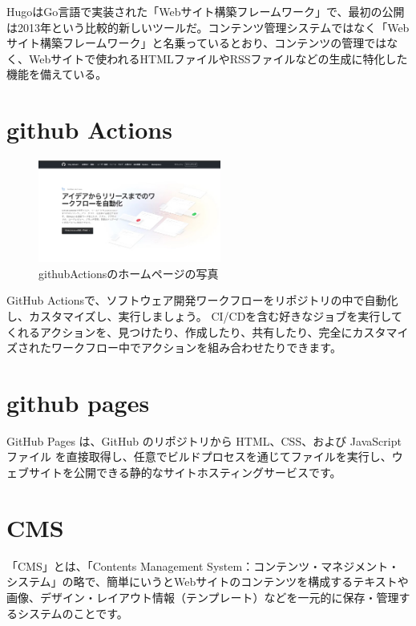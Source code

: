   \begin{tcolorbox}[title=hugoとは]
    HugoはGo言語で実装された「Webサイト構築フレームワーク」で、最初の公開は2013年という比較的新しいツールだ。コンテンツ管理システムではなく「Webサイト構築フレームワーク」と名乗っているとおり、コンテンツの管理ではなく、Webサイトで使われるHTMLファイルやRSSファイルなどの生成に特化した機能を備えている。
    \cite{hugoとは} \cite{hugo公式}
  \end{tcolorbox}

\section{github Actions}

  \begin{figure}[H]
    \centering
    \includegraphics[width=6cm]{./image/02-chap3/githubActions.png}
    \caption{githubActionsのホームページの写真}
    \label{chap3-githubAction-image}
  \end{figure}

  \begin{tcolorbox}[title=github pagesとは]
    GitHub Actionsで、ソフトウェア開発ワークフローをリポジトリの中で自動化し、カスタマイズし、実行しましょう。 CI/CDを含む好きなジョブを実行してくれるアクションを、見つけたり、作成したり、共有したり、完全にカスタマイズされたワークフロー中でアクションを組み合わせたりできます。
    \cite{githubAction}
  \end{tcolorbox}

\section{github pages}

  \begin{tcolorbox}[title=hugoとは]
    GitHub Pages は、GitHub のリポジトリから HTML、CSS、および JavaScript ファイル を直接取得し、任意でビルドプロセスを通じてファイルを実行し、ウェブサイトを公開できる静的なサイトホスティングサービスです。
    \cite{githubPages}
  \end{tcolorbox}


\section{CMS}

  \begin{tcolorbox}[title=hugoとは]
    「CMS」とは、「Contents Management System：コンテンツ・マネジメント・システム」の略で、簡単にいうとWebサイトのコンテンツを構成するテキストや画像、デザイン・レイアウト情報（テンプレート）などを一元的に保存・管理するシステムのことです。
    \cite{cmsとは}
  \end{tcolorbox}

